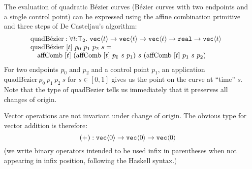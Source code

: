 \begin{example}
  The evaluation of quadratic B\'{e}zier curves (B\'{e}zier curves
  with two endpoints and a single control point) can be expressed
  using the affine combination primitive and three steps of De
  Casteljau's algorithm:
  \begin{displaymath}
    \begin{array}{@{}l}
      \mathrm{quadB\acute{e}zier} : \forall t \mathord:\SynTransl_2.\ \tyPrim{vec}{t} \to \tyPrim{vec}{t} \to \tyPrim{vec}{t} \to \tyPrimNm{real} \to \tyPrim{vec}{t} \\
      \mathrm{quadB\acute{e}zier}\ [t]\ p_0\ p_1\ p_2\ s = \\
      \quad \mathrm{affComb}\ [t]\ (\mathrm{affComb}\ [t]\ p_0\ s\ p_1)\ s\ (\mathrm{affComb}\ [t]\ p_1\ s\ p_2) \\
    \end{array}
  \end{displaymath}
  For two endpoints $p_0$ and $p_2$ and a control point $p_1$, an
  application $\mathrm{quadB\acute{e}zier}\ p_0\ p_1\ p_2\ s$ for $s
  \in [0,1]$ gives us the point on the curve at ``time'' $s$. Note
  that the type of $\mathrm{quadB\acute{e}zier}$ tells us immediately
  that it preserves all changes of origin.
\end{example}


Vector operations are not invariant under change of origin. The
obvious type for vector addition is therefore:
\begin{displaymath}
  (+) : \texttt{vec}\langle 0 \rangle \to \texttt{vec}\langle 0 \rangle \to \texttt{vec}\langle 0 \rangle
\end{displaymath}
(we write binary operators intended to be used infix in parentheses
when not appearing in infix position, following the Haskell
syntax.)


